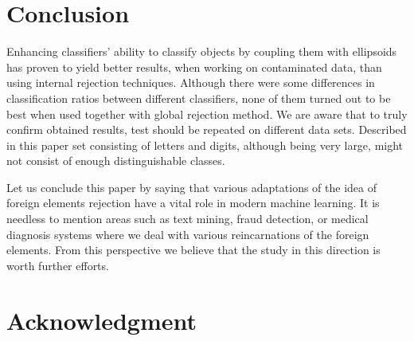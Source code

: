 \documentclass{llncs}
\begin{document}




\section{Conclusion}
  \label{sec:Conclusion}

Enhancing classifiers' ability to classify objects by coupling them with ellipsoids has proven to yield better results, when working on contaminated data, than using internal rejection techniques. Although there were some differences in classification ratios between different classifiers, none of them turned out to be best when used together with global rejection method. We are aware that to truly confirm obtained results, test should be repeated on different data sets. Described in this paper set consisting of letters and digits, although being very large, might not consist of enough distinguishable classes.

Let us conclude this paper by saying that various adaptations of the idea of foreign elements rejection have a vital role in modern machine learning. It is needless to mention areas such as text mining, fraud detection, or medical diagnosis systems where we deal with various reincarnations of the foreign elements. From this perspective we believe that the study in this direction is worth further efforts.


\section*{Acknowledgment}
\end{document}
